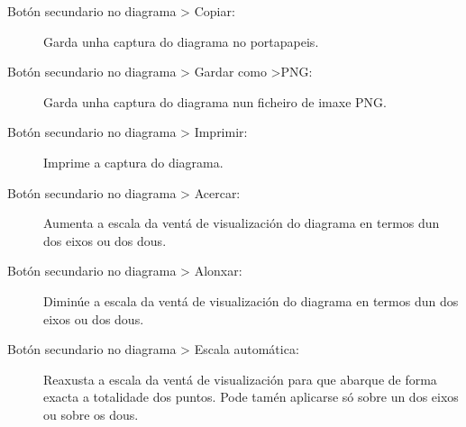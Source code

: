 \begin{description}
\item[Botón secundario no diagrama \textgreater{} Copiar:] \hfill
Garda unha captura do diagrama no portapapeis.
\item[Botón secundario no diagrama \textgreater{} Gardar como \textgreater{}PNG:] \hfill
Garda unha captura do diagrama nun ficheiro de imaxe PNG.
\item[Botón secundario no diagrama \textgreater{} Imprimir:] \hfill
Imprime a captura do diagrama.
\item[Botón secundario no diagrama \textgreater{} Acercar:] \hfill
Aumenta a escala da ventá de visualización do diagrama en termos dun dos eixos ou dos dous.
\item[Botón secundario no diagrama \textgreater{} Alonxar:] \hfill
Diminúe a escala da ventá de visualización do diagrama en termos dun dos eixos ou dos dous.
\item[Botón secundario no diagrama \textgreater{} Escala automática:] \hfill
Reaxusta a escala da ventá de visualización para que abarque de forma exacta a totalidade dos puntos. Pode tamén aplicarse só sobre un dos eixos ou sobre os dous.


\end{description}
